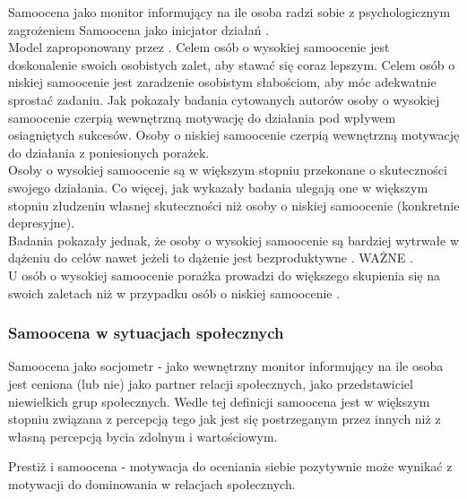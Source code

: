 \documentclass[man]{apa6}
\begin{document}
Samoocena jako monitor informujący na ile osoba radzi sobie z psychologicznym zagrożeniem \parencite{bednar1989self}
Samoocena jako inicjator działań \parencite{bandura1982self, bandura1994self}.\\

Model zaproponowany przez \textcite{baumeister1985self}. Celem osób o wysokiej samoocenie jest doskonalenie swoich osobistych zalet, aby stawać się coraz lepszym. Celem osób o niskiej samoocenie jest zaradzenie osobistym słabościom, aby móc adekwatnie sprostać zadaniu. Jak pokazały badania cytowanych autorów osoby o wysokiej samoocenie czerpią wewnętrzną motywację do działania pod wpływem osiagniętych sukcesów. Osoby o niskiej samoocenie czerpią wewnętrzną motywację do działania z poniesionych porażek.\\

Osoby o wysokiej samoocenie są w większym stopniu przekonane o skuteczności swojego działania. Co więcej, jak wykazały badania \textcite{alloy1979judgment} ulegają one w większym stopniu złudzeniu własnej skuteczności niż osoby o niskiej samoocenie (konkretnie depresyjne).\\

Badania \textcite{mcfarlin1984knowing} pokazały jednak, że osoby o wysokiej samoocenie są bardziej wytrwałe w dążeniu do celów nawet jeżeli to dążenie jest bezproduktywne \parencite[zob. również ][]{baumeister1993ego}.
WAŻNE \parencite{di2002self}.\\

U osób o wysokiej samoocenie porażka prowadzi do większego skupienia się na swoich zaletach niż w przypadku osób o niskiej samoocenie \parencite{dodgson1998self}.


\subsubsection{Samoocena w sytuacjach społecznych}

Samoocena jako socjometr \parencite{leary1995self, leary2000nature} - jako wewnętrzny monitor informujący na ile osoba jest ceniona (lub nie) jako partner relacji społecznych, jako przedstawiciel niewielkich grup społecznych. Wedle tej definicji samoocena jest w większym stopniu związana z percepcją tego jak jest się postrzeganym przez innych niż z własną percepcją bycia zdolnym i wartościowym.

Prestiż i samoocena \parencite{barkow1980prestige} - motywacja do oceniania siebie pozytywnie może wynikać z motywacji do dominowania w relacjach społecznych.
\end{document}
